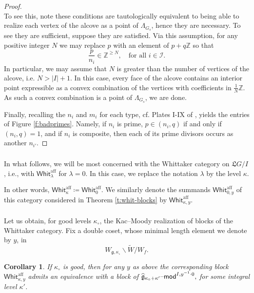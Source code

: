 \documentclass[11pt,reqno]{amsart}
\newcommand{\aff}{\operatorname{aff}}
\newcommand{\fL}{\mathfrak{L}}
\newcommand{\fg}{\mathfrak{g}}
\newtheorem{cor}[subsubsection]{Corollary}
\theoremstyle{remark}
\numberwithin{equation}{section}
\renewcommand{\mod}{\text{\textendash}\mathsf{mod}}
\newcommand{\Whit}{\mathsf{Whit}}
\begin{document}
\begin{proof}
\[	\]
	To see this, note these conditions are tautologically equivalent to being 
	able to realize each vertex of the alcove as a point of $\Lambda_{G_s}$, 
	hence they are necessary. To see they are sufficient, suppose they are 
	satisfied. Via this assumption, for any positive integer $N$ we may replace 
	$p$ with an element 
	of $p + q \mathbb{Z}$ so that 
	\[
	\frac{p}{n_i} \in \mathbb{Z}^{\geqslant N}, \quad \text{for all } i \in 
	\mathscr{I}.
	\]
	In particular, we may assume that $N$ is greater than the number of 
	vertices of the alcove, i.e. $N > \lvert I \rvert + 1$. In this case, 
	every face of the alcove contains an interior point expressible as a convex 
	combination of the vertices with coefficients in $\frac{1}{N}\mathbb{Z}$. 
	As such a convex combination is a point of $\Lambda_{G_s}$, we are done. 
	
	
	Finally, recalling the $n_i$ and $m_i$ for each type, cf. Plates I-IX of 
	\cite{bour}, yields the entries of Figure \ref{f:badprimes}. Namely, 
	if $n_i$ is prime, $p \in (n_i, q)$ if and only if $(n_i, q) = 1$, and if 
	$n_i$ 	is composite, then each of its prime divisors occurs as another 
	$n_{i'}$.  
	\end{proof} 
	
\subsubsection{}

In what follows, we will be most concerned with the Whittaker category
on $\fL G/I$, i.e., with $\Whit_{\lambda}^{\aff}$ for $\lambda = 0$.
In this case, we replace the notation $\lambda$ by the level $\kappa$.

In other words, $\Whit_{\kappa}^{\aff} \coloneqq \Whit_0^{\aff}$.
We similarly denote the summands $\Whit_{0,y}^{\aff}$ 
of this category considered in
Theorem \ref{t:whit-blocks} by $\Whit_{\kappa,y}^{\aff}$.

\subsubsection{}

Let us obtain, for good levels $\kappa_\circ$, the Kac--Moody realization of 
blocks of the Whittaker category. Fix a double coset, whose minimal length 
element we denote by $y$,  in
%
\[ W_{\fg, \kappa_{\circ}} \backslash \widetilde{W} / W_f.
\] 
%


\begin{cor}\label{c:wtokm} If $\kappa_{\circ}$ is good, then for any $y$ as 
	above the 
	corresponding  block $\Whit_{\kappa, y}^{\aff}$ admits an
	equivalence with a block of $\widehat{\fg}_{\kappa_{\circ} + 
		\kappa'}\mod^{I, y^{-1} \cdot 0},$
	for some integral level $\kappa'$. 
	
\end{cor}
\end{document}
